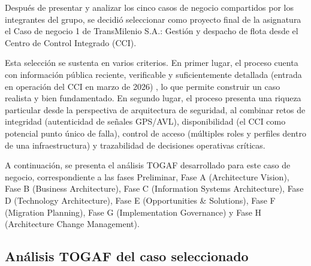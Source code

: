 Después de presentar y analizar los cinco casos de negocio compartidos por los integrantes del grupo, se decidió seleccionar como proyecto final de la asignatura el Caso de negocio 1 de TransMilenio S.A.: Gestión y despacho de flota desde el Centro de Control Integrado (CCI).

Esta selección se sustenta en varios criterios. En primer lugar, el proceso cuenta con información pública reciente, verificable y suficientemente detallada (entrada en operación del CCI en marzo de 2026) \parencite{transmilenio2026cci}, lo que permite construir un caso realista y bien fundamentado. En segundo lugar, el proceso presenta una riqueza particular desde la perspectiva de arquitectura de seguridad, al combinar retos de integridad (autenticidad de señales GPS/AVL), disponibilidad (el CCI como potencial punto único de falla), control de acceso (múltiples roles y perfiles dentro de una infraestructura) y trazabilidad de decisiones operativas críticas.

A continuación, se presenta el análisis TOGAF desarrollado para este caso de negocio, correspondiente a las fases Preliminar, Fase A (Architecture Vision), Fase B (Business Architecture), Fase C (Information Systems Architecture), Fase D (Technology Architecture), Fase E (Opportunities \& Solutions), Fase F (Migration Planning), Fase G (Implementation Governance) y Fase H (Architecture Change Management).

\subsection{Análisis TOGAF del caso seleccionado}

